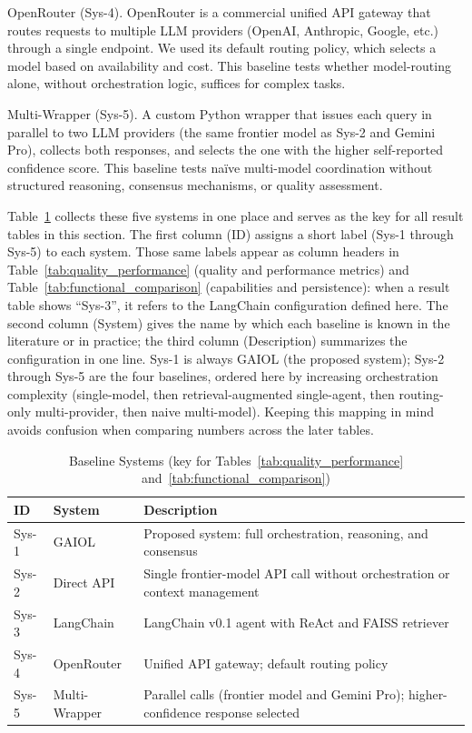 \documentclass{iopjournal}
\begin{document}
OpenRouter (Sys-4). OpenRouter is a commercial unified API gateway that routes requests to multiple LLM providers (OpenAI, Anthropic, Google, etc.) through a single endpoint. We used its default routing policy, which selects a model based on availability and cost. This baseline tests whether model-routing alone, without orchestration logic, suffices for complex tasks.

Multi-Wrapper (Sys-5). A custom Python wrapper that issues each query in parallel to two LLM providers (the same frontier model as Sys-2 and Gemini Pro), collects both responses, and selects the one with the higher self-reported confidence score. This baseline tests na\"ive multi-model coordination without structured reasoning, consensus mechanisms, or quality assessment.

Table~\ref{tab:baselines} collects these five systems in one place and serves as the key for all result tables in this section. The first column (ID) assigns a short label (Sys-1 through Sys-5) to each system. Those same labels appear as column headers in Table~\ref{tab:quality_performance} (quality and performance metrics) and Table~\ref{tab:functional_comparison} (capabilities and persistence): when a result table shows ``Sys-3'', it refers to the LangChain configuration defined here. The second column (System) gives the name by which each baseline is known in the literature or in practice; the third column (Description) summarizes the configuration in one line. Sys-1 is always GAIOL (the proposed system); Sys-2 through Sys-5 are the four baselines, ordered here by increasing orchestration complexity (single-model, then retrieval-augmented single-agent, then routing-only multi-provider, then naive multi-model). Keeping this mapping in mind avoids confusion when comparing numbers across the later tables.
\begin{table}[!ht]
\centering
\caption{Baseline Systems (key for Tables~\ref{tab:quality_performance} and~\ref{tab:functional_comparison})}
\label{tab:baselines}
\begin{tabular}{ll>{\raggedright\arraybackslash}p{5.6cm}}
\toprule
ID & System & Description \\
\midrule
Sys-1 & GAIOL & Proposed system: full orchestration, reasoning, and consensus \\
Sys-2 & Direct API & Single frontier-model API call without orchestration or context management \\
Sys-3 & LangChain & LangChain v0.1 agent with ReAct and FAISS retriever \\
Sys-4 & OpenRouter & Unified API gateway; default routing policy \\
Sys-5 & Multi-Wrapper & Parallel calls (frontier model and Gemini Pro); higher-confidence response selected \\
\bottomrule
\end{tabular}
\end{table}
\end{document}
